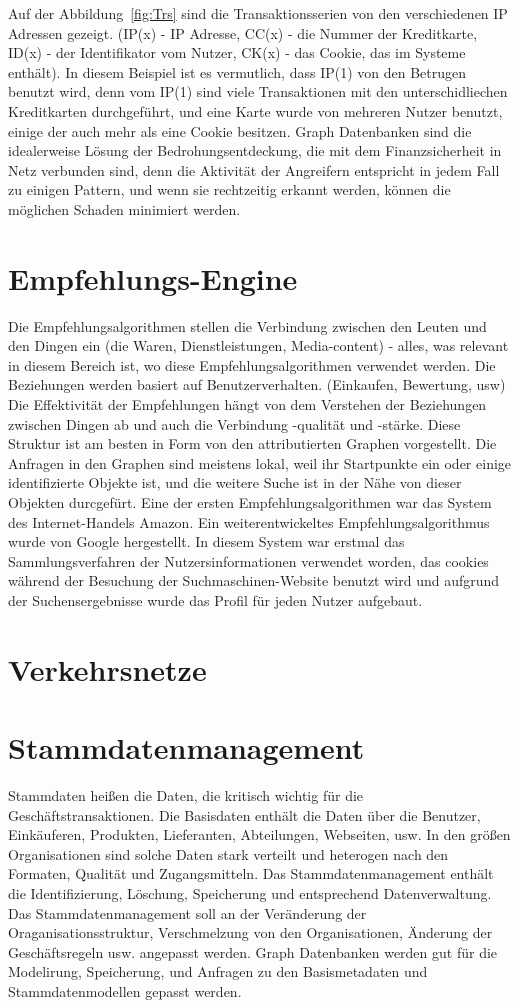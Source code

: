 Auf der Abbildung~\ref{fig:Trs} sind die Transaktionsserien von den verschiedenen IP Adressen gezeigt. (IP(x) - IP Adresse, CC(x) - die Nummer der Kreditkarte, ID(x) - der Identifikator vom Nutzer, CK(x) - das Cookie, das im Systeme enthält). In diesem Beispiel ist es vermutlich, dass IP(1) von den Betrugen benutzt wird, denn vom IP(1) sind viele Transaktionen mit den unterschidliechen Kreditkarten durchgeführt, und eine Karte wurde von mehreren Nutzer benutzt, einige der auch mehr als eine Cookie besitzen. 
Graph Datenbanken sind die idealerweise Lösung der Bedrohungsentdeckung, die mit dem Finanzsicherheit in Netz verbunden sind, denn die Aktivität der Angreifern entspricht in jedem Fall zu einigen Pattern, und wenn sie rechtzeitig erkannt werden, können die möglichen Schaden minimiert werden.

\section{Empfehlungs-Engine}
Die Empfehlungsalgorithmen stellen die Verbindung zwischen den Leuten und den Dingen ein (die Waren, Dienstleistungen, Media-content) - alles, was relevant in diesem Bereich ist, wo diese Empfehlungsalgorithmen verwendet werden. Die Beziehungen werden basiert auf Benutzerverhalten. (Einkaufen, Bewertung, usw)
Die Effektivität der Empfehlungen hängt von dem Verstehen der Beziehungen zwischen Dingen ab und auch die Verbindung -qualität und -stärke. Diese Struktur ist am besten in Form von den attributierten Graphen vorgestellt. Die Anfragen in den Graphen sind meistens lokal, weil ihr Startpunkte ein oder einige identifizierte Objekte ist, und die weitere Suche ist in der Nähe von dieser Objekten durcgefürt.
Eine der ersten Empfehlungsalgorithmen war das System des Internet-Handels Amazon. Ein weiterentwickeltes Empfehlungsalgorithmus wurde von Google hergestellt. In diesem System war erstmal das Sammlungsverfahren der Nutzersinformationen verwendet worden, das cookies während der Besuchung der Suchmaschinen-Website benutzt wird und aufgrund der Suchensergebnisse wurde das Profil für jeden Nutzer aufgebaut.

\section{Verkehrsnetze}
\section{Stammdatenmanagement}
Stammdaten heißen die Daten, die kritisch wichtig für die Geschäftstransaktionen. Die Basisdaten enthält die Daten über die Benutzer, Einkäuferen, Produkten, Lieferanten, Abteilungen, Webseiten, usw. In den größen Organisationen sind solche Daten stark verteilt und heterogen nach den Formaten, Qualität und Zugangsmitteln. Das Stammdatenmanagement enthält die Identifizierung, Löschung, Speicherung und entsprechend Datenverwaltung. Das Stammdatenmanagement soll an der Veränderung der Oraganisationsstruktur, Verschmelzung von den Organisationen, Änderung der Geschäftsregeln usw. angepasst werden. Graph Datenbanken werden gut für die Modelirung, Speicherung, und Anfragen zu den Basismetadaten und Stammdatenmodellen gepasst werden. 

